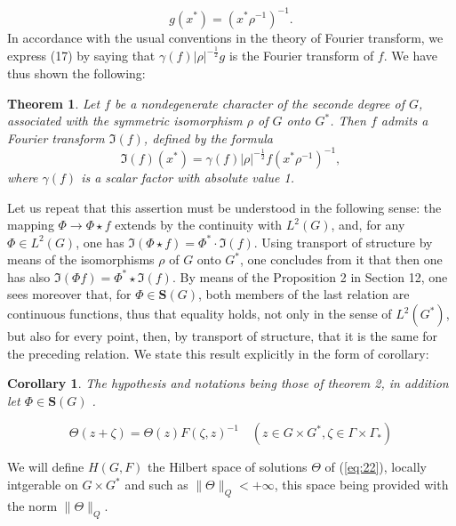\documentclass[12pt]{amsart}
\newtheorem{thm}{Theorem}
\newtheorem{cor}{Corollary}
\newcounter{ssection}
\renewcommand{\subsection}{
  \addtocounter{ssection}{1}{\bf  \arabic{ssection}.\  }}
\begin{document}
\[
g(x^{*})=(x^{*}\rho^{-1})^{-1}.\]
 In accordance with the usual conventions in the theory of Fourier
transform, we express (17) by saying that $\gamma(f)|\rho|^{-\frac{1}{2}}g$
is the Fourier transform of $f$. We have thus shown the following: 
\begin{thm}
Let $f$ be a nondegenerate character of the seconde degree of $G$,
associated with the symmetric isomorphism $\rho$ of $G$ onto $G^{*}$.
Then $f$ admits a Fourier transform $\mathfrak{I}(f)$, defined by
the formula \[
\mathfrak{I}(f)(x^{*})=\gamma(f)|\rho|^{-\frac{1}{2}}f(x^{*}\rho^{-1})^{-1},\]
 where $\gamma(f)$ is a scalar factor with absolute value 1.
\end{thm}
Let us repeat that this assertion must be understood in the following
sense: the mapping $\Phi\to\Phi\star f$ extends by the continuity
with $L^{2}(G)$, and, for any $\Phi\in L^{2}(G)$, one has $\mathfrak{I}(\Phi\star f)=\Phi^{*}\cdot\mathfrak{I}(f)$.
Using transport of structure by means of the isomorphisms $\rho$
of $G$ onto $G^{*}$, one concludes from it that then one has also
$\mathfrak{I}(\Phi f)=\Phi^{*}\star\mathfrak{I}(f)$. By means of
the Proposition 2 in Section 12, one sees moreover that, for $\Phi\in\mathbf{S}(G)$,
both members of the last relation are continuous functions, thus that
equality holds, not only in the sense of $L^{2}(G^{*})$, but also
for every point, then, by transport of structure, that it is the same
for the preceding relation. We state this result explicitly in the
form of corollary: 
\begin{cor}
The hypothesis and notations being those of theorem 2, in addition
let $\Phi\in\mathbf{S}(G)$ .
\end{cor}

\setcounter{ssection}{16}
\subsection{}
\begin{equation}\label{eq:22}
\Theta(z+\zeta)=\Theta(z)F(\zeta,z)^{-1} 
\quad (z\in G\times G^*, \zeta \in \Gamma\times \Gamma_*)
\end{equation}

\subsection{}
We will define $H(G,F)$ the Hilbert space of solutions $\Theta$ of (\ref{eq:22}),
 locally intgerable on $G\times G^*$ 
and such as $\|\Theta\|_Q< +\infty$, 
this space being provided with the norm $\|\Theta\|_Q$.
\end{document}

